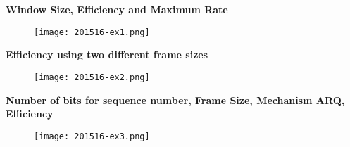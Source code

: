 \documentclass[../resumosRCOM.tex]{subfiles}
\begin{document}
\textbf{Window Size, Efficiency and Maximum Rate}
\begin{figure}[H]
    \centering
    \texttt{[image: 201516-ex1.png]}
\end{figure}

\textbf{Efficiency using two different frame sizes}
\begin{figure}[H]
    \centering
    \texttt{[image: 201516-ex2.png]}
\end{figure}

\textbf{Number of bits for sequence number, Frame Size, Mechanism ARQ, Efficiency}
\begin{figure}[H]
    \centering
    \texttt{[image: 201516-ex3.png]}
\end{figure}
\end{document}
